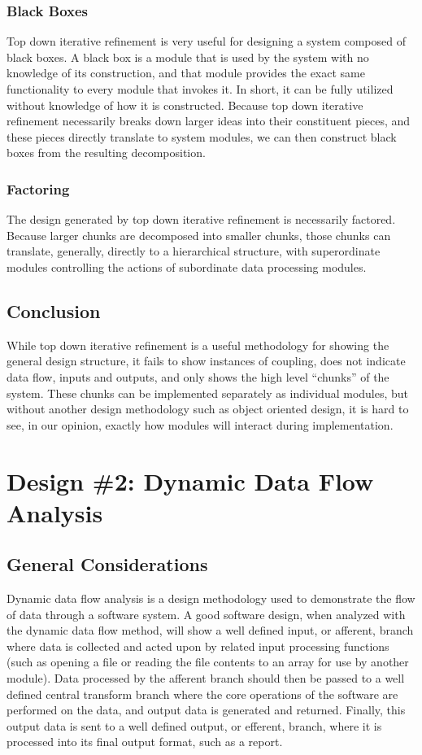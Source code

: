 \documentclass{article}
\begin{document}
		\subsubsection{Black Boxes}
			Top down iterative refinement is very useful for designing a system composed of black boxes. A black box is a module that is used by the system with no knowledge of its construction, and that module provides the exact same functionality to every module that invokes it. In short, it can be fully utilized without knowledge of how it is constructed. Because top down iterative refinement necessarily breaks down larger ideas into their constituent pieces, and these pieces directly translate to system modules, we can then construct black boxes from the resulting decomposition. 
		\subsubsection{Factoring}
			The design generated by top down iterative refinement is necessarily factored. Because larger chunks are decomposed into smaller chunks, those chunks can translate, generally, directly to a hierarchical structure, with superordinate modules controlling the actions of subordinate data processing modules. 
	\subsection{Conclusion}
		While top down iterative refinement is a useful methodology for showing the general design structure, it fails to show instances of coupling, does not indicate data flow, inputs and outputs, and only shows the high level ``chunks'' of the system. These chunks can be implemented separately as individual modules, but without another design methodology such as object oriented design, it is hard to see, in our opinion, exactly how modules will interact during implementation. 
%
%
\section{Design \#2: Dynamic Data Flow Analysis}
	\subsection{General Considerations}
		Dynamic data flow analysis is a design methodology used to demonstrate the flow of data through a software system. A good software design, when analyzed with the dynamic data flow method, will show a well defined input, or afferent, branch where data is collected and acted upon by related input processing functions (such as opening a file or reading the file contents to an array for use by another module). Data processed by the afferent branch should then be passed to a well defined central transform branch where the core operations of the software are performed on the data, and output data is generated and returned. Finally, this output data is sent to a well defined output, or efferent, branch, where it is processed into its final output format, such as a report. 
	
\end{document}

